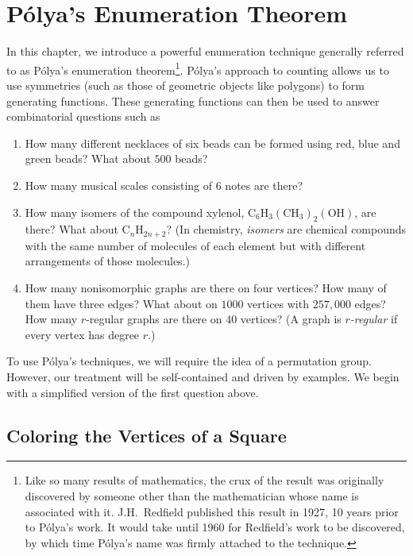 \chapter{P\'olya's Enumeration Theorem}\label{ch:polya}

In this chapter, we introduce a powerful enumeration technique
generally referred to as P\'olya's enumeration theorem\footnote{Like
  so many results of mathematics, the crux of the result was
  originally discovered by someone other than the mathematician whose
  name is associated with it. J.H.\ Redfield published this result in
  1927, 10 years prior to P\'olya's work. It would take until 1960 for
  Redfield's work to be discovered, by which time P\'olya's name was
  firmly attached to the technique.}. P\'olya's approach to counting
allows us to use symmetries (such as those of geometric objects like
polygons) to form generating functions. These generating functions can
then be used to answer combinatorial questions such as

\begin{enumerate}
\item How many different necklaces of six beads can be formed using
  red, blue and green beads? What about $500$ beads?
\item How many musical scales consisting of $6$ notes are there?
\item How many isomers of the compound xylenol,
  $\text{C}_6\text{H}_3(\text{CH}_3)_2(\text{OH})$, are there? What
  about $\text{C}_n \text{H}_{2n+2}$? (In chemistry, \emph{isomers}
  are chemical compounds with the same number of molecules of each
  element but with different arrangements of those molecules.)
\item How many nonisomorphic graphs are there on four vertices? How
  many of them have three edges? What about on $1000$ vertices with
  $257,000$ edges? How many $r$-regular graphs are there on $40$
  vertices? (A graph is $r$\emph{-regular} if every vertex has degree
  $r$.)
\end{enumerate}

To use P\'olya's techniques, we will require the idea of a permutation
group. However, our treatment will be self-contained and driven by
examples. We begin with a simplified version of the first question above.

\section{Coloring the Vertices of a Square}\label{s:polya:square}

